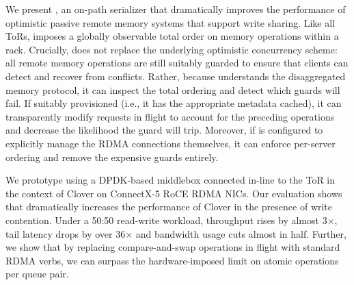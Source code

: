 We present {\sword}, an on-path serializer
that dramatically improves the performance of optimistic passive
remote memory systems that support write sharing.  Like all ToRs,
{\sword} imposes a globally observable total order on memory
operations within a rack.  Crucially, {\sword} does not replace the
underlying optimistic concurrency scheme: all remote memory operations
are still suitably guarded to ensure that clients can detect and
recover from conflicts.  Rather, because {\sword} understands the
disaggregated memory protocol, it can inspect the total ordering and
detect which guards will fail.  If suitably provisioned (i.e., it has
the appropriate metadata cached), it can transparently modify requests
in flight to account for the preceding operations and decrease the
likelihood the guard will trip.  Moreover, if {\sword} is configured
to explicitly manage the RDMA connections themselves, it can enforce
per-server ordering and remove the expensive guards entirely.

We prototype {\sword} using a DPDK-based middlebox connected in-line
to the ToR in the context of Clover on ConnectX-5 RoCE RDMA NICs.  Our
evaluation shows that {\sword} dramatically increases the performance
of Clover in the presence of write contention.  Under a 50:50
read-write workload, throughput rises by almost 3$\times$, tail
latency drops by over 36$\times$ and bandwidth usage cuts almost in
half.  Further, we show that by replacing compare-and-swap operations
in flight with standard RDMA verbs, we can surpass the
hardware-imposed limit on atomic operations per queue pair.

